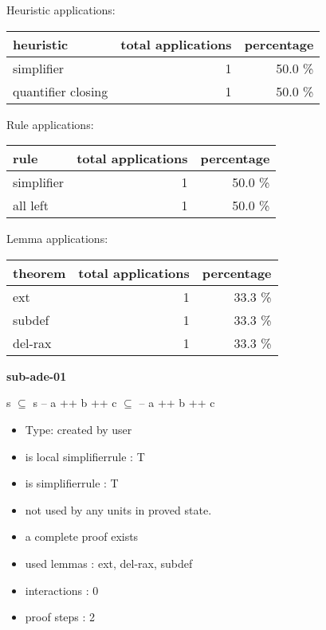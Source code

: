 \documentclass[a4paper]{article}
\begin{document}
\medskip


Heuristic applications:

\begin{supertabular}{l|r|r}
heuristic	& total applications & percentage \\ \hline
simplifier & 1 & 50.0 \% \\
quantifier closing & 1 & 50.0 \% \\

\end{supertabular}

Rule applications:

\begin{supertabular}{l|r|r}
rule	        & total applications & percentage \\ \hline
simplifier & 1 & 50.0 \% \\
all left & 1 & 50.0 \% \\

\end{supertabular}

Lemma applications:

\begin{supertabular}{l|r|r}
theorem	        & total applications & percentage \\ \hline
ext & 1 & 33.3 \% \\
subdef & 1 & 33.3 \% \\
del-rax & 1 & 33.3 \% \\

\end{supertabular}
\pagebreak

{\LARGE\bf sub-ade-01}\label{lemma-sub-ade-01}

\medskip

 \Fol s $\subseteq$  \Imp s -- a ++ b ++ c $\subseteq$  -- a ++ b ++ c

\begin{itemize}

\item Type: created by user

\item is local simplifierrule : T
\item is simplifierrule : T
\item not used by any units in proved state.
\item       a complete proof exists
\item       used lemmas  : ext, del-rax, subdef
\item       interactions : 0
\item       proof steps  : 2
\end{itemize}
\end{document}

